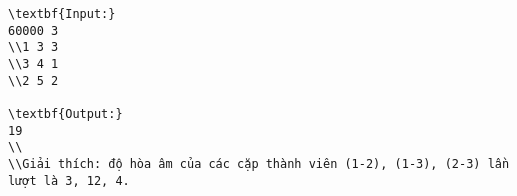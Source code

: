 \begin{verbatim}
\textbf{Input:}
60000 3
\\1 3 3
\\3 4 1
\\2 5 2

\textbf{Output:}
19
\\
\\Giải thích: độ hòa âm của các cặp thành viên (1-2), (1-3), (2-3) lần lượt là 3, 12, 4. \end{verbatim}